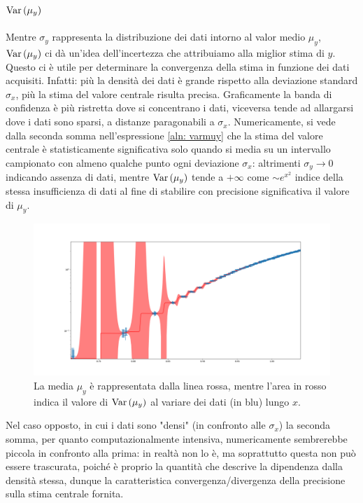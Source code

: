 \documentclass{article}[a4paper, oneside, 11pt]
\begin{document}
\subsection{$\text{Var}\left(\mu_y\right)$}
Mentre $\sigma_y$ rappresenta la distribuzione dei dati intorno al valor medio 
$\mu_y$, $\text{Var}\left(\mu_y\right)$ ci dà un'idea dell’incertezza che attribuiamo alla
miglior stima di $y$. Questo ci è utile per determinare la convergenza della
stima in funzione dei dati acquisiti.
Infatti: più la densità dei dati è grande rispetto alla deviazione standard
$\sigma_x$, più la stima del valore centrale risulta precisa. Graficamente
la banda di confidenza è più ristretta dove si concentrano i dati, viceversa
tende ad allargarsi dove i dati sono sparsi, a distanze paragonabili a
$\sigma_x$. Numericamente, si vede dalla seconda somma nell'espressione
\eqref{aln: varmuy} che la stima del valore centrale è statisticamente
significativa solo quando si media su un intervallo campionato con almeno
qualche punto ogni deviazione $\sigma_x$: altrimenti $\sigma_y \to 0$
indicando assenza di dati, mentre $\text{Var}\left(\mu_y\right)$ tende a $+\infty$ come
$\sim e^{x^2}$ indice della stessa insufficienza di dati al fine di stabilire
con precisione significativa il valore di $\mu_y$.
\begin{figure}[H]
	\centering 
 		\includegraphics[scale=0.32]{./varmuy.png}
 	\caption{La media $\mu_y$ è rappresentata dalla linea rossa, mentre
	l'area in rosso indica il valore di $\text{Var}\left(\mu_y\right)$ al variare dei
	dati (in blu) lungo $x$. \label{fig: varmuy}}
\end{figure}
Nel caso opposto, in cui i dati sono "densi" (in confronto alle $\sigma_x$)
la seconda somma, per quanto computazionalmente intensiva, numericamente
sembrerebbe piccola in confronto alla prima: in realtà non lo è, ma
soprattutto questa non può essere trascurata, poiché è proprio la quantità
che descrive la dipendenza dalla densità stessa, dunque la caratteristica
convergenza/divergenza della precisione sulla stima centrale fornita.
\end{document}
